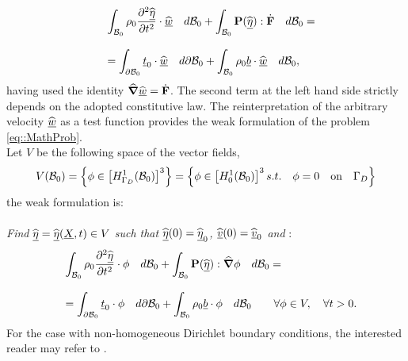 \begin{equation}
  \begin{array}{lll} & \displaystyle
    \int_{\mathcal{B}_0}\rho_0\frac{\partial^2 \widehat{\underline{\eta}}}{\partial
      t^2}\cdot\widehat{\underline{w}}\quad d\mathcal{B}_0 +
    \int_{\mathcal{B}_0}\textbf{P}(\widehat{\underline{\eta}}):\dot{\textbf{F}}\quad d\mathcal{B}_0 = \\ \\ &
    \displaystyle = \int_{\partial
      \mathcal{B}_0}\underline{t}_0\cdot\widehat{\underline{w}}\quad d\partial\mathcal{B}_0 +
    \int_{\mathcal{B}_0}\rho_0 \underline{b}\cdot\widehat{\underline{w}}\quad d\mathcal{B}_0,
  \end{array}
  \label{eq::secondIntegral}
\end{equation}
having used the identity $\widehat{\boldsymbol{\nabla}}\widehat{\underline{w}} = \dot{\textbf{F}}$. The
second term at the left hand side strictly depends on the adopted
constitutive law. The reinterpretation of the arbitrary velocity
$\widehat{\underline{w}}$ as a test function provides the weak formulation of the
problem \eqref{eq::MathProb}.\\ Let $V$ be the following space of the
vector fields,
\begin{equation}
  V(\mathcal{B}_0)=\left\{\phi\in\left[H_{\Gamma_D}^1(\mathcal{B}_0)\right]^3\right\} =
  \left\{\phi\in\left[H_{0}^1(\mathcal{B}_0)\right]^3
    s.t. \quad \phi=0 \quad\text{on}\quad\Gamma_D\right\}
  \label{eq::TestSpace}
\end{equation}
the weak formulation is:\\ \\ \textit{Find
  $\widehat{\underline{\eta}}=\widehat{\underline{\eta}}(\underline{X},t)\in V$ such that $\widehat{\underline{\eta}}(0)=\widehat{\underline{\eta}}_0$,
  $\widehat{\underline{v}}(0)=\widehat{\underline{v}}_0$ and} :
\begin{equation}
  \begin{array}{lll} & \displaystyle
    \int_{\mathcal{B}_0}\rho_0\frac{\partial^2 \widehat{\underline{\eta}}}{\partial
      t^2}\cdot\phi\quad d\mathcal{B}_0 +
    \int_{\mathcal{B}_0}\textbf{P}(\widehat{\underline{\eta}}):\widehat{\boldsymbol{\nabla}}\phi\quad d\mathcal{B}_0 = \\ \\ &
    \displaystyle = \int_{\partial \mathcal{B}_0}\underline{t}_0\cdot\phi\quad
    d\partial\mathcal{B}_0 + \int_{\mathcal{B}_0}\rho_0 \underline{b}\cdot\phi\quad
    d\mathcal{B}_0 \qquad \forall \phi\in V, \quad \forall t>0.
  \end{array}
  \label{eq::WF}
\end{equation}
For the case with non-homogeneous Dirichlet boundary
conditions, the interested reader may refer to \cite{Hughes}.

